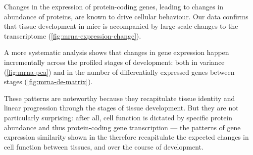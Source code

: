 Changes in the expression of protein-coding genes, leading to changes in
abundance of proteins, are known to drive cellular behaviour. Our data
confirms that tissue development in mice is accompanied by large-scale changes
to the \mrna transcriptome (\cref{fig:mrna-expression-change}).

A more systematic analysis shows that changes in gene expression happen
incrementally across the profiled stages of development: both in variance
(\cref{fig:mrna-pca}) and in the number of differentially expressed genes
between stages (\cref{fig:mrna-de-matrix}).

These patterns are noteworthy because they recapitulate tissue identity and
linear progression through the stages of tissue development. But they are not
particularly surprising: after all, cell function is dictated by specific
protein abundance and thus protein-coding gene transcription --- the patterns of
gene expression similarity shown in the \pca therefore recapitulate the expected
changes in cell function between tissues, and over the course of development.



